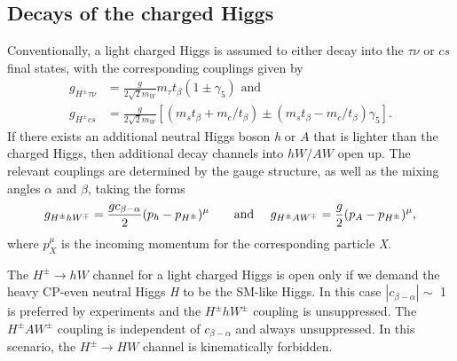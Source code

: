 \subsection{Decays of the charged Higgs}
Conventionally, a light charged Higgs is assumed to either decay into the $\tau\nu$ or $cs$ final states, with the corresponding couplings given by
\begin{align*}
  g_{H^{\pm} \tau\nu} &= \frac{g}{2 \sqrt{2} m_W} m_\tau t_{\beta}(1\pm \gamma_5 ) \text{ and} \\
g_{H^{\pm} cs} &= \frac{g}{2 \sqrt{2} m_W} \left[ (m_s t_{\beta} + m_c /t_\beta ) \pm (m_s t_{\beta} - m_c /t_\beta ) \gamma_5 \right].
 \end{align*}
If there exists an additional neutral Higgs boson \emph{h} or $A$ that is lighter than the charged Higgs, then additional decay channels into $hW/AW$ open up. The relevant couplings are determined by the gauge structure, as well as the mixing angles $\alpha$ and $\beta$, taking the forms \cite{Gunion:1989we} 
\begin{align*}
  g_{H^{\pm} h W^{\mp}}= \frac{gc_{\beta-\alpha}}{2}(p_{h}-p_{H^{\pm}})^\mu &&\text{~~ and }&&
 g_{H^{\pm} A W^{\mp}}= \frac{g}{2}(p_{A}-p_{H^{\pm}})^\mu,
 \end{align*}
 where $p_X^\mu$ is the incoming momentum for the corresponding particle \emph{X}. 

The $H^{\pm}\rightarrow hW$ channel for a light charged Higgs is open only if we demand the heavy CP-even neutral Higgs \emph{H} to be the SM-like Higgs. In this case $|c_{\beta-\alpha}| \sim$ 1 is preferred by experiments and the $H^{\pm}hW^{\pm}$ coupling is unsuppressed. The $H^{\pm} A W^{\pm}$ coupling is independent of $c_{\beta-\alpha}$ and always unsuppressed. In this scenario, the $H^{\pm} \rightarrow HW$ channel is kinematically forbidden.

